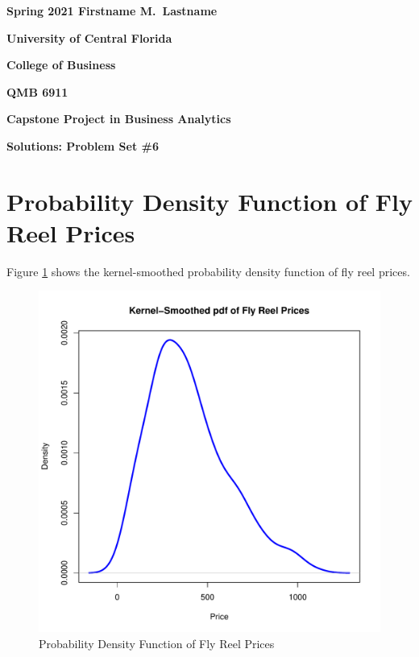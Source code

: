 \documentclass[11pt]{book}
\begin{document}

\pagestyle{empty}
{\noindent\bf Spring 2021 \hfill Firstname M.~Lastname}
\vskip 16pt
\centerline{\bf University of Central Florida}
\centerline{\bf College of Business}
\vskip 16pt
\centerline{\bf QMB 6911}
\centerline{\bf Capstone Project in Business Analytics}
\vskip 10pt
\centerline{\bf Solutions:  Problem Set \#6}
\vskip 32pt
\noindent




\pagebreak
\section*{Probability Density Function of Fly Reel Prices}

Figure \ref{fig:density_prices} shows  the kernel-smoothed probability density function of fly reel prices.

\begin{figure}[h!]
  \centering
  \includegraphics[scale = 0.5, keepaspectratio=true]{../Figures/density_prices}
  \caption{Probability Density Function of Fly Reel Prices} \label{fig:density_prices}
\end{figure}
\end{document}
